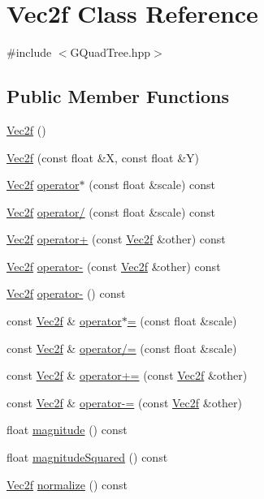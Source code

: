 \hypertarget{class_vec2f}{}\section{Vec2f Class Reference}
\label{class_vec2f}


{\ttfamily \#include $<$G\+Quad\+Tree.\+hpp$>$}

\subsection*{Public Member Functions}
\begin{DoxyCompactItemize}
\item 
\hyperlink{class_vec2f_a3582875fbf3badc6af02646e07bcf440}{Vec2f} ()
\item 
\hyperlink{class_vec2f_adc6379aa69e77f1c02816526373ccf39}{Vec2f} (const float \&X, const float \&Y)
\item 
\hyperlink{class_vec2f}{Vec2f} \hyperlink{class_vec2f_a64d710036747668a47d469746d36385e}{operator$\ast$} (const float \&scale) const 
\item 
\hyperlink{class_vec2f}{Vec2f} \hyperlink{class_vec2f_a9ea89dc85a3c1876966bf6b61d528ba8}{operator/} (const float \&scale) const 
\item 
\hyperlink{class_vec2f}{Vec2f} \hyperlink{class_vec2f_af287e4d86a048103d730aac482f4e098}{operator+} (const \hyperlink{class_vec2f}{Vec2f} \&other) const 
\item 
\hyperlink{class_vec2f}{Vec2f} \hyperlink{class_vec2f_a4bcc35901fef4cd4060865c01891f8ec}{operator-\/} (const \hyperlink{class_vec2f}{Vec2f} \&other) const 
\item 
\hyperlink{class_vec2f}{Vec2f} \hyperlink{class_vec2f_aa36cbdb64b6d73304810e6d4d550b31b}{operator-\/} () const 
\item 
const \hyperlink{class_vec2f}{Vec2f} \& \hyperlink{class_vec2f_a6f5a6529d94c78f23707498843832dc9}{operator$\ast$=} (const float \&scale)
\item 
const \hyperlink{class_vec2f}{Vec2f} \& \hyperlink{class_vec2f_a729ec7c09843628d69893f1aabe64339}{operator/=} (const float \&scale)
\item 
const \hyperlink{class_vec2f}{Vec2f} \& \hyperlink{class_vec2f_a06ba27d71a4bc7cea71a2aa040609174}{operator+=} (const \hyperlink{class_vec2f}{Vec2f} \&other)
\item 
const \hyperlink{class_vec2f}{Vec2f} \& \hyperlink{class_vec2f_a7f2676b3a2f5f0fb1458d0bd3e5e4c61}{operator-\/=} (const \hyperlink{class_vec2f}{Vec2f} \&other)
\item 
float \hyperlink{class_vec2f_a7c25dae0135ff28ad0002d7eb84282f4}{magnitude} () const 
\item 
float \hyperlink{class_vec2f_a727b0b82033d72bae5e5fdd1a8f3e657}{magnitude\+Squared} () const 
\item 
\hyperlink{class_vec2f}{Vec2f} \hyperlink{class_vec2f_aa29a5b27e1bdfd154c965b322fb57a95}{normalize} () const 
\end{DoxyCompactItemize}
